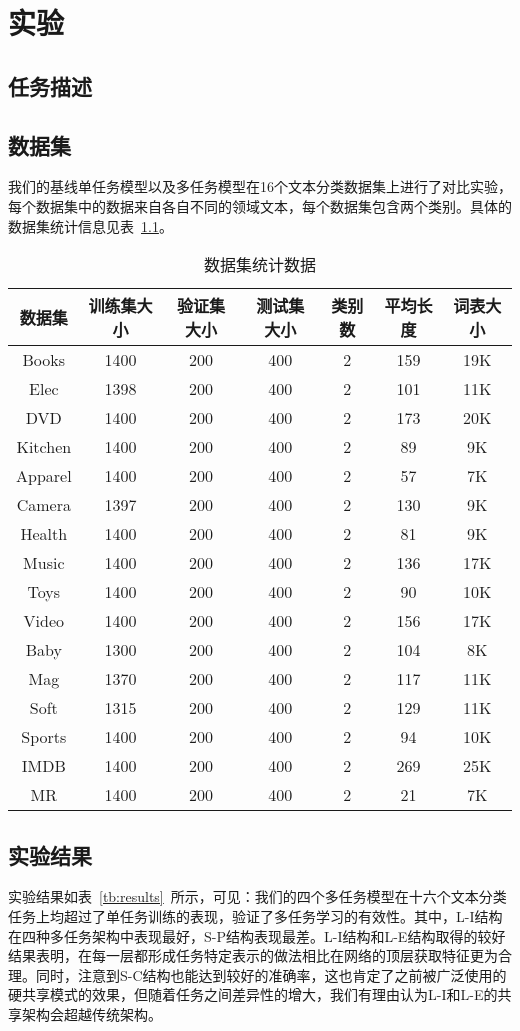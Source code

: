\chapter{实验}
\label{cha:exp}

\section{任务描述}
\label{sec:task}

\section{数据集}
\label{sec:ds}
我们的基线单任务模型以及多任务模型在16个文本分类数据集上进行了对比实验，每个数据集中的数据来自各自不同的领域文本，每个数据集包含两个类别。具体的数据集统计信息见表~\ref{tb:dataset}。

\begin{table}[htb]
	\centering
	\caption{数据集统计数据}
	\begin{tabular}{ccccccc}
		\toprule[2pt]
		数据集&训练集大小&验证集大小&测试集大小&类别数&平均长度&词表大小\\
		\midrule[1pt]
		Books& 1400& 200& 400& 2& 159& 19K\\
		Elec& 1398& 200& 400& 2& 101& 11K\\
		DVD& 1400& 200& 400& 2& 173& 20K\\
		Kitchen& 1400& 200& 400& 2& 89& 9K\\
		Apparel& 1400& 200& 400& 2& 57& 7K\\
		Camera& 1397& 200& 400& 2& 130& 9K\\
		Health& 1400& 200& 400& 2& 81& 9K\\
		Music& 1400& 200& 400& 2& 136& 17K\\
		Toys& 1400& 200& 400& 2& 90& 10K\\
		Video& 1400& 200& 400& 2& 156& 17K\\
		Baby& 1300& 200& 400& 2& 104& 8K\\
		Mag& 1370& 200& 400& 2& 117& 11K\\
		Soft& 1315& 200& 400& 2& 129& 11K\\
		Sports& 1400& 200& 400& 2& 94& 10K\\
		IMDB& 1400& 200& 400& 2& 269& 25K\\
		MR& 1400& 200& 400& 2& 21& 7K\\
		\bottomrule[2pt]
	\end{tabular}
	\label{tb:dataset}
\end{table}
\section{实验结果}
\label{sec:results}
实验结果如表~\ref{tb:results}~所示，可见：我们的四个多任务模型在十六个文本分类任务上均超过了单任务训练的表现，验证了多任务学习的有效性。其中，L-I结构在四种多任务架构中表现最好，S-P结构表现最差。L-I结构和L-E结构取得的较好结果表明，在每一层都形成任务特定表示的做法相比在网络的顶层获取特征更为合理。同时，注意到S-C结构也能达到较好的准确率，这也肯定了之前被广泛使用的硬共享模式的效果，但随着任务之间差异性的增大，我们有理由认为L-I和L-E的共享架构会超越传统架构。

